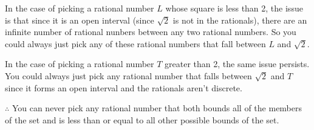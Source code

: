 \documentclass[answers]{exam}
\theoremstyle{remark}
\theoremstyle{definition}
\begin{document}
\begin{questions}
\begin{solution}

In the case of picking a rational number $L$ whose square is less than 2,
the issue is that since it is an open interval (since $\sqrt{2}$ is not in the rationals),
there are an infinite number of rational nunbers between any two rational numbers.
So you could always just pick
any of these rational numbers that fall between $L$ and $\sqrt{2}$.

In the case of picking a rational number $T$ greater than 2,
the same issue persists. You could always just pick any rational number that falls
between $\sqrt{2}$ and $T$ since it forms an open interval and the rationals aren't discrete.

$\therefore$ You can never pick any rational number that both bounds all
of the members of the set and is less than or equal to all other possible bounds of the set.

\end{solution}

\end{questions}
\end{document}
